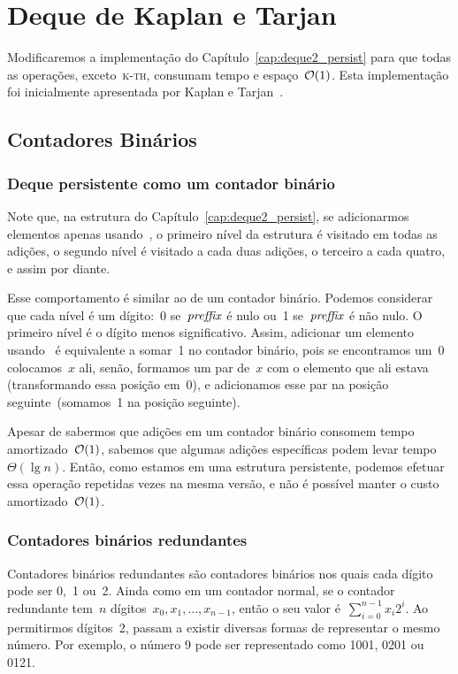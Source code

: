 \documentclass[main.tex]{subfiles}
\begin{document}
\chapter{Deque de Kaplan e Tarjan} \label{cap:deque3_persist}

Modificaremos a implementação do Capítulo~\ref{cap:deque2_persist} para que todas as operações, exceto~\textsc{k-th}, consumam tempo e espaço~$\mathcal{O}(1)$. Esta implementação foi inicialmente apresentada por Kaplan e Tarjan~\cite{KaplanT1999}.

\section{Contadores Binários} \label{sec:contbin}

\subsection{Deque persistente como um contador binário}

Note que, na estrutura do Capítulo~\ref{cap:deque2_persist}, se adicionarmos elementos apenas usando~, o primeiro nível da estrutura é visitado em todas as adições, o segundo nível é visitado a cada duas adições, o terceiro a cada quatro, e assim por diante.

Esse comportamento é similar ao de um contador binário. Podemos considerar que cada nível é um dígito:~0 se~$\mathit{preffix}$ é nulo ou~1 se~$\mathit{preffix}$ é não nulo. O primeiro nível é o dígito menos significativo. Assim, adicionar um elemento usando~ é equivalente a somar~1 no contador binário, pois se encontramos um~0 colocamos~$x$ ali, senão, formamos um par de~$x$ com o elemento que ali estava (transformando essa posição em~0), e adicionamos esse par na posição seguinte~(somamos~1 na posição seguinte).

Apesar de sabermos que adições em um contador binário consomem tempo amortizado~$\mathcal{O}(1)$, sabemos que algumas adições específicas podem levar tempo~$\Theta(\lg n)$. Então, como estamos em uma estrutura persistente, podemos efetuar essa operação repetidas vezes na mesma versão, e não é possível manter o custo amortizado~$\mathcal{O}(1)$.

\subsection{Contadores binários redundantes}

Contadores binários redundantes são contadores binários nos quais cada dígito pode ser 0,~1 ou~2. Ainda como em um contador normal, se o contador redundante tem~$n$ dígitos~$x_0, x_1, \ldots, x_{n-1}$, então o seu valor é~$\sum\limits_{i=0}^{n-1}{x_i 2^i}$. Ao permitirmos dígitos~2, passam a existir diversas formas de representar o mesmo número. Por exemplo, o número 9 pode ser representado como 1001, 0201 ou 0121.
\end{document}

